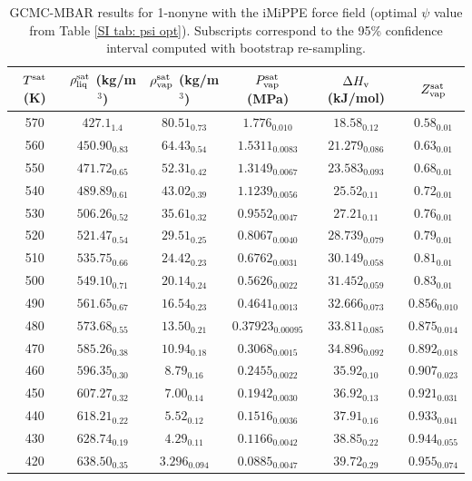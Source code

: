 \documentclass[journal=jctc,manuscript=article]{achemso}
\begin{document}
\begin{table}[htb!]
	\caption{GCMC-MBAR results for 1-nonyne with the iMiPPE force field (optimal $\psi$ value from Table \ref{SI tab: psi opt}). Subscripts correspond to the 95\% confidence interval computed with bootstrap re-sampling.}
	\begin{center}
		\begin{tabular}{|c|c|c|c|c|c|}
			\hline
			$T^{\rm sat}$ (K) & $\rho_{\rm liq}^{\rm sat}$ (kg/m$^3$) & $\rho_{\rm vap}^{\rm sat}$ (kg/m$^3$) & $P_{\rm vap}^{\rm sat}$ (MPa) & $\Delta H_{\rm v}$ (kJ/mol) & $Z_{\rm vap}^{\rm sat}$ \\ \hline
			570 & $427.1_{1.4}$ & $80.51_{0.73}$ & $1.776_{0.010}$ & $18.58_{0.12}$ & $0.58_{0.01}$ \\
			560 & $450.90_{0.83}$ & $64.43_{0.54}$ & $1.5311_{0.0083}$ & $21.279_{0.086}$ & $0.63_{0.01}$ \\
			550 & $471.72_{0.65}$ & $52.31_{0.42}$ & $1.3149_{0.0067}$ & $23.583_{0.093}$ & $0.68_{0.01}$ \\
			540 & $489.89_{0.61}$ & $43.02_{0.39}$ & $1.1239_{0.0056}$ & $25.52_{0.11}$ & $0.72_{0.01}$ \\
			530 & $506.26_{0.52}$ & $35.61_{0.32}$ & $0.9552_{0.0047}$ & $27.21_{0.11}$ & $0.76_{0.01}$ \\
			520 & $521.47_{0.54}$ & $29.51_{0.25}$ & $0.8067_{0.0040}$ & $28.739_{0.079}$ & $0.79_{0.01}$ \\
			510 & $535.75_{0.66}$ & $24.42_{0.23}$ & $0.6762_{0.0031}$ & $30.149_{0.058}$ & $0.81_{0.01}$ \\
			500 & $549.10_{0.71}$ & $20.14_{0.24}$ & $0.5626_{0.0022}$ & $31.452_{0.059}$ & $0.83_{0.01}$ \\
			490 & $561.65_{0.67}$ & $16.54_{0.23}$ & $0.4641_{0.0013}$ & $32.666_{0.073}$ & $0.856_{0.010}$ \\
			480 & $573.68_{0.55}$ & $13.50_{0.21}$ & $0.37923_{0.00095}$ & $33.811_{0.085}$ & $0.875_{0.014}$ \\
			470 & $585.26_{0.38}$ & $10.94_{0.18}$ & $0.3068_{0.0015}$ & $34.896_{0.092}$ & $0.892_{0.018}$ \\
			460 & $596.35_{0.30}$ & $8.79_{0.16}$ & $0.2455_{0.0022}$ & $35.92_{0.10}$ & $0.907_{0.023}$ \\
			450 & $607.27_{0.32}$ & $7.00_{0.14}$ & $0.1942_{0.0030}$ & $36.92_{0.13}$ & $0.921_{0.031}$ \\
			440 & $618.21_{0.22}$ & $5.52_{0.12}$ & $0.1516_{0.0036}$ & $37.91_{0.16}$ & $0.933_{0.041}$ \\
			430 & $628.74_{0.19}$ & $4.29_{0.11}$ & $0.1166_{0.0042}$ & $38.85_{0.22}$ & $0.944_{0.055}$ \\
			420 & $638.50_{0.35}$ & $3.296_{0.094}$ & $0.0885_{0.0047}$ & $39.72_{0.29}$ & $0.955_{0.074}$ \\
			\hline
		\end{tabular}
	\end{center}
\end{table}
\end{document}
